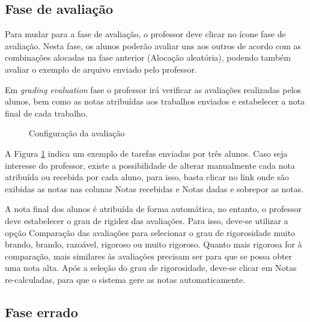 \subsection{Fase de avaliação}

Para mudar para a fase de avaliação, o professor deve clicar no ícone fase de avaliação. Nesta fase, os alunos poderão avaliar uns aos outros de acordo com as combinações alocadas na fase anterior (Alocação aleatória), podendo também avaliar o exemplo de arquivo enviado pelo professor.

Em  \textit{grading evaluation} fase o professor irá verificar as avaliações realizadas pelos alunos, bem como as notas atribuídas aos trabalhos enviados e estabelecer a nota final de cada trabalho.

\begin{figure}[htbp]
 \begin{center}
  \caption{Configuração da avaliação}
  \label{fig:config_ava2}
 \end{center}
\end{figure}

A Figura \ref{fig:config_ava2} indica um exemplo de tarefas enviadas por três alunos. Caso seja interesse do professor, existe a possibilidade de alterar manualmente cada nota atribuída ou recebida por cada aluno, para isso, basta clicar no link onde são exibidas as notas nas colunas Notas recebidas e Notas dadas e sobrepor as notas.

A nota final dos alunos é atribuída de forma automática, no entanto, o professor deve estabelecer o grau de rigidez das avaliações. Para isso, deve-se utilizar a opção Comparação das avaliações para selecionar o grau de rigorosidade muito brando, brando, razoável, rigoroso ou muito rigoroso. Quanto mais rigorosa for à comparação, mais similares às avaliações precisam ser para que se possa obter uma nota alta. Após a seleção do grau de rigorosidade, deve-se clicar em Notas re-calculadas, para que o sistema gere as notas automaticamente.

\subsection{Fase errado}

